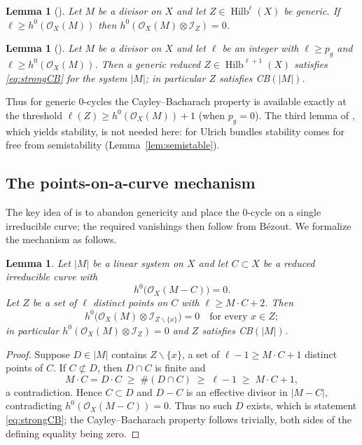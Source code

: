 \documentclass{amsart}
\newtheorem{lemma}[theorem]{Lemma}
\theoremstyle{definition}
\newcommand{\OO}{\mathcal{O}}
\newcommand{\II}{\mathcal{I}}
\newcommand{\Hilb}{\operatorname{Hilb}}
\newcommand{\len}{\ell}
\begin{document}
\begin{lemma}[{\cite[Lem.~2.4]{LQ94}}]\label{lem:LQ24}
Let $M$ be a divisor on $X$ and let $Z\in\Hilb^{\len}(X)$ be generic. If $\len\ge h^0(\OO_X(M))$ then $h^0(\OO_X(M)\otimes\II_Z)=0$.
\end{lemma}

\begin{lemma}[{\cite[Lem.~2.5]{LQ94}}]\label{lem:LQ25}
Let $M$ be a divisor on $X$ and let $\len$ be an integer with $\len\ge p_g$ and $\len\ge h^0(\OO_X(M))$. Then a generic reduced $Z\in\Hilb^{\len+1}(X)$ satisfies \eqref{eq:strongCB} for the system $|M|$; in particular $Z$ satisfies \textup{CB}$(|M|)$.
\end{lemma}

Thus for generic $0$-cycles the Cayley--Bacharach property is available exactly at the threshold $\len(Z)\ge h^0(\OO_X(M))+1$ (when $p_g=0$). The third lemma of \cite{LQ94}, which yields stability, is not needed here: for Ulrich bundles stability comes for free from semistability (Lemma~\ref{lem:semistable}).

\subsection{The points-on-a-curve mechanism}\label{subsec:Anghel}
The key idea of \cite{An94} is to abandon genericity and place the $0$-cycle on a single irreducible curve; the required vanishings then follow from B\'ezout. We formalize the mechanism as follows.

\begin{lemma}\label{lem:bezout}
Let $|M|$ be a linear system on $X$ and let $C\subset X$ be a reduced irreducible curve with
\[
h^0\bigl(\OO_X(M-C)\bigr)=0 .
\]
Let $Z$ be a set of $\len$ distinct points on $C$ with $\len\ge M\cdot C+2$. Then
\[
h^0\bigl(\OO_X(M)\otimes\II_{Z\smallsetminus\{x\}}\bigr)=0\quad\text{for every }x\in Z;
\]
in particular $h^0(\OO_X(M)\otimes\II_Z)=0$ and $Z$ satisfies \textup{CB}$(|M|)$.
\end{lemma}

\begin{proof}
Suppose $D\in|M|$ contains $Z\smallsetminus\{x\}$, a set of $\len-1\ge M\cdot C+1$ distinct points of $C$. If $C\not\subset D$, then $D\cap C$ is finite and
\[
M\cdot C=D\cdot C\;\ge\;\#(D\cap C)\;\ge\;\len-1\;\ge\;M\cdot C+1,
\]
a contradiction. Hence $C\subset D$ and $D-C$ is an effective divisor in $|M-C|$, contradicting $h^0(\OO_X(M-C))=0$. Thus no such $D$ exists, which is statement \eqref{eq:strongCB}; the Cayley--Bacharach property follows trivially, both sides of the defining equality being zero.
\end{proof}
\end{document}

